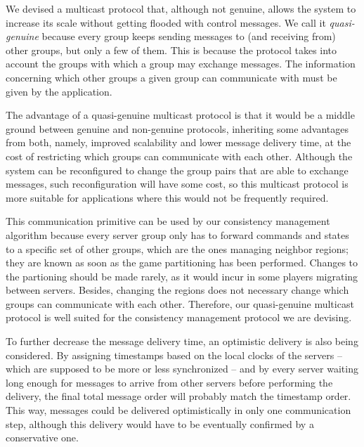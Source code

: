 \documentclass[]{usiinfprospectus}
\begin{document}
We devised a multicast protocol that, although not genuine, allows the system to increase its scale without getting flooded with control messages. We call it \emph{quasi-genuine} because every group keeps sending messages to (and receiving from) other groups, but only a few of them. This is because the protocol takes into account the groups with which a group may exchange messages. The information concerning which other groups a given group can communicate with must be given by the application.

The advantage of a quasi-genuine multicast protocol is that it would be a middle ground between genuine and non-genuine protocols, inheriting some advantages from both, namely, improved scalability and lower message delivery time, at the cost of restricting which groups can communicate with each other. Although the system can be reconfigured to change the group pairs that are able to exchange messages, such reconfiguration will have some cost, so this multicast protocol is more suitable for applications where this would not be frequently required.

This communication primitive can be used by our consistency management algorithm because every server group only has to forward commands and states to a specific set of other groups, which are the ones managing neighbor regions; they are known as soon as the game partitioning has been performed. Changes to the partioning should be made rarely, as it would incur in some players migrating between servers. Besides, changing the regions does not necessary change which groups can communicate with each other. Therefore, our quasi-genuine multicast protocol is well suited for the consistency management protocol we are devising.

To further decrease the message delivery time, an optimistic delivery is also being considered. By assigning timestamps based on the local clocks of the servers -- which are supposed to be more or less synchronized -- and by every server waiting long enough for messages to arrive from other servers before performing the delivery, the final total message order will probably match the timestamp order. This way, messages could be delivered optimistically in only one communication step, although this delivery would have to be eventually confirmed by a conservative one.
\end{document}
